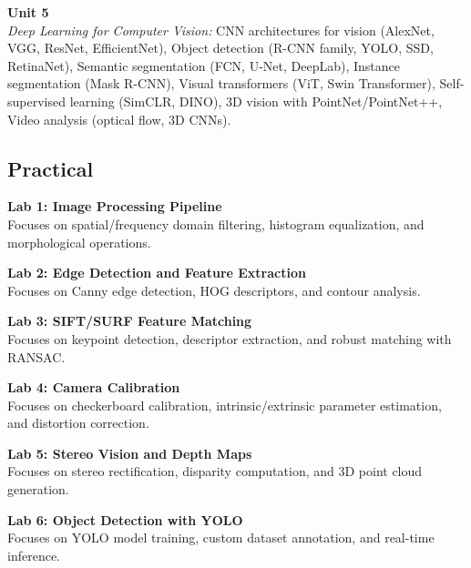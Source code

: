 \vspace{0.3cm}

\noindent\textbf{Unit 5} \\
\textit{Deep Learning for Computer Vision:} CNN architectures for vision (AlexNet, VGG, ResNet, EfficientNet), Object detection (R-CNN family, YOLO, SSD, RetinaNet), Semantic segmentation (FCN, U-Net, DeepLab), Instance segmentation (Mask R-CNN), Visual transformers (ViT, Swin Transformer), Self-supervised learning (SimCLR, DINO), 3D vision with PointNet/PointNet++, Video analysis (optical flow, 3D CNNs).

\newpage

\subsection*{Practical}
\noindent\textbf{Lab 1: Image Processing Pipeline} \\
Focuses on spatial/frequency domain filtering, histogram equalization, and morphological operations.

\vspace{0.2cm}

\noindent\textbf{Lab 2: Edge Detection and Feature Extraction} \\
Focuses on Canny edge detection, HOG descriptors, and contour analysis.

\vspace{0.2cm}

\noindent\textbf{Lab 3: SIFT/SURF Feature Matching} \\
Focuses on keypoint detection, descriptor extraction, and robust matching with RANSAC.

\vspace{0.2cm}

\noindent\textbf{Lab 4: Camera Calibration} \\
Focuses on checkerboard calibration, intrinsic/extrinsic parameter estimation, and distortion correction.

\vspace{0.2cm}

\noindent\textbf{Lab 5: Stereo Vision and Depth Maps} \\
Focuses on stereo rectification, disparity computation, and 3D point cloud generation.

\vspace{0.2cm}

\noindent\textbf{Lab 6: Object Detection with YOLO} \\
Focuses on YOLO model training, custom dataset annotation, and real-time inference.

